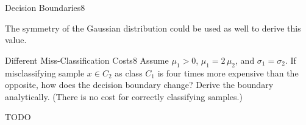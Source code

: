 \begin{questions}
\begin{question}{Decision Boundaries}{8}
\begin{answer}
	The symmetry of the Gaussian distribution could be used as well to derive this value.
\end{answer}

\end{question}


\begin{question}{Different Miss-Classification Costs}{8}
Assume $\mu_1 > 0$, $\mu_1 = 2\, \mu_2$, and $\sigma_1=\sigma_2$. If misclassifying sample $x \in C_2$ as class $C_1$ is four times more expensive than the opposite, how does the decision boundary change? Derive the boundary analytically.
(There is no cost for correctly classifying samples.)

\begin{answer}
{\LARGE TODO}
\end{answer}

\end{question}


\end{questions}
